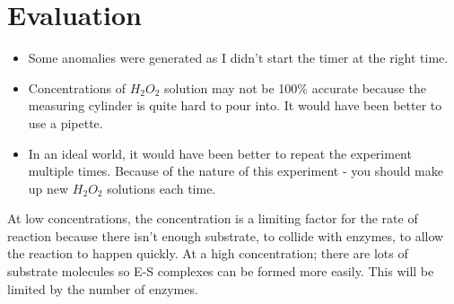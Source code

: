 \documentclass{thomasClass}
\begin{document}
\section{Evaluation}
\begin{itemize}
    \item Some anomalies were generated as I didn't start the timer at the right time.
    \item Concentrations of $H_2O_2$ solution may not be 100\% accurate because the measuring cylinder is quite hard to pour into. It would have been better to use a pipette.
    \item In an ideal world, it would have been better to repeat the experiment multiple times. Because of the nature of this experiment - you should make up new $H_2O_2$ solutions each time.
\end{itemize}
At low concentrations, the concentration is a limiting factor for the rate of reaction because there isn't enough substrate, to collide with enzymes, to allow the reaction to happen quickly. At a high concentration; there are lots of substrate molecules so E-S complexes can be formed more easily. This will be limited by the number of enzymes.
\end{document}
